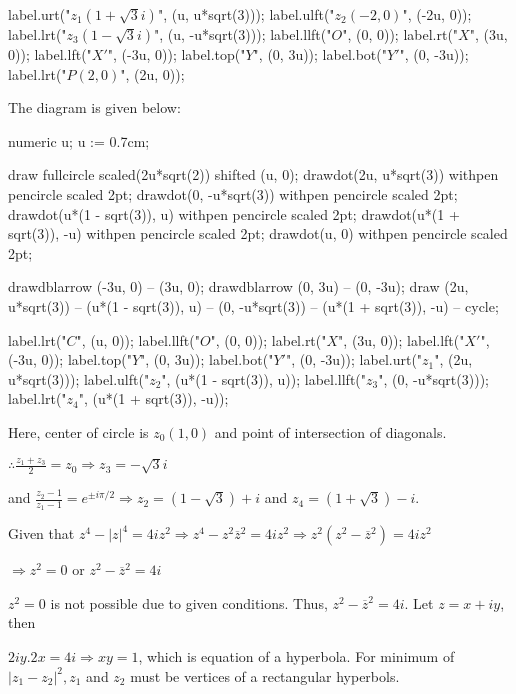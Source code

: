       label.urt("$z_1(1 + \sqrt{3}i)$", (u, u*sqrt(3)));
      label.ulft("$z_2(-2, 0)$", (-2u, 0));
      label.lrt("$z_3(1 - \sqrt{3}i)$", (u, -u*sqrt(3)));
      label.llft("$O$", (0, 0));
      label.rt("$X$", (3u, 0));
      label.lft("$X'$", (-3u, 0));
      label.top("$Y$", (0, 3u));
      label.bot("$Y'$", (0, -3u));
      label.lrt("$P(2, 0)$", (2u, 0));
    \stopMPcode
  \stopplacefigure
\item The diagram is given below:

    \startplacefigure[location=force]
    \startMPcode
      numeric u;
      u := 0.7cm;

      draw fullcircle scaled(2u*sqrt(2)) shifted (u, 0);
      drawdot(2u, u*sqrt(3)) withpen pencircle scaled 2pt;
      drawdot(0, -u*sqrt(3)) withpen pencircle scaled 2pt;
      drawdot(u*(1 - sqrt(3)), u) withpen pencircle scaled 2pt;
      drawdot(u*(1 + sqrt(3)), -u) withpen pencircle scaled 2pt;
      drawdot(u, 0) withpen pencircle scaled 2pt;

      drawdblarrow (-3u, 0) -- (3u, 0);
      drawdblarrow (0, 3u) -- (0, -3u);
      draw (2u, u*sqrt(3)) -- (u*(1 - sqrt(3)), u) -- (0, -u*sqrt(3)) -- (u*(1 + sqrt(3)), -u) -- cycle;

      label.lrt("$C$", (u, 0));
      label.llft("$O$", (0, 0));
      label.rt("$X$", (3u, 0));
      label.lft("$X'$", (-3u, 0));
      label.top("$Y$", (0, 3u));
      label.bot("$Y'$", (0, -3u));
      label.urt("$z_1$", (2u, u*sqrt(3)));
      label.ulft("$z_2$", (u*(1 - sqrt(3)), u));
      label.llft("$z_3$", (0, -u*sqrt(3)));
      label.lrt("$z_4$", (u*(1 + sqrt(3)), -u));
    \stopMPcode
  \stopplacefigure

  Here, center of circle is $z_0(1, 0)$ and point of intersection of diagonals.

  $\therefore \frac{z_1 + z_3}{2} = z_0\Rightarrow z_3 = -\sqrt{3}i$

  and $\frac{z_2 - 1}{z_1 - 1} = e^{\pm i\pi/2}\Rightarrow z_2 = (1 - \sqrt{3}) + i$ and $z_4 = (1 +
  \sqrt{3}) - i$.
\item Given that $z^4 - |z|^4 = 4iz^2 \Rightarrow z^4 - z^2\overline{z}^2 = 4iz^2 \Rightarrow z^2(z^2
  - \overline{z}^2) = 4iz^2$

  $\Rightarrow z^2 = 0$ or $z^2 - \overline{z}^2 = 4i$

  $z^2 = 0$ is not possible due to given conditions. Thus, $z^2 - \overline{z}^2 = 4i$. Let $z = x + iy$,
  then

  $2iy.2x = 4i\Rightarrow xy = 1$, which is equation of a hyperbola. For minimum of $|z_1 - z_2|^2, z_1$ and
  $z_2$ must be vertices of a rectangular hyperbols.

